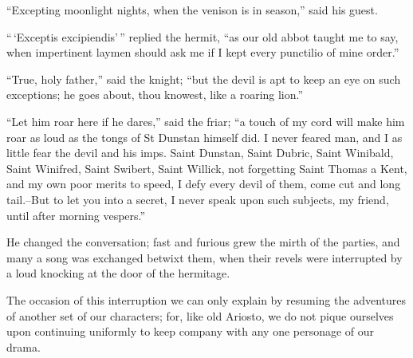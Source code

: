 ``Excepting moonlight nights, when the venison is in season,'' said his
guest.

``\,`Exceptis excipiendis'\,'' replied the hermit, ``as our old abbot
taught me to say, when impertinent laymen should ask me if I kept every
punctilio of mine order.''

``True, holy father,'' said the knight; ``but the devil is apt to keep
an eye on such exceptions; he goes about, thou knowest, like a roaring
lion.''

``Let him roar here if he dares,'' said the friar; ``a touch of my cord
will make him roar as loud as the tongs of St Dunstan himself did. I
never feared man, and I as little fear the devil and his imps. Saint
Dunstan, Saint Dubric, Saint Winibald, Saint Winifred, Saint Swibert,
Saint Willick, not forgetting Saint Thomas a Kent, and my own poor
merits to speed, I defy every devil of them, come cut and long
tail.--But to let you into a secret, I never speak upon such subjects,
my friend, until after morning vespers.''

He changed the conversation; fast and furious grew the mirth of the
parties, and many a song was exchanged betwixt them, when their revels
were interrupted by a loud knocking at the door of the hermitage.

The occasion of this interruption we can only explain by resuming the
adventures of another set of our characters; for, like old Ariosto, we
do not pique ourselves upon continuing uniformly to keep company with
any one personage of our drama.
